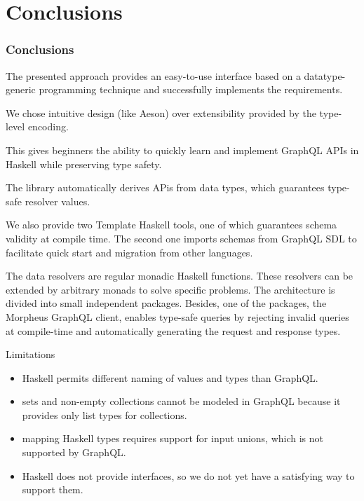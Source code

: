 \section{Conclusions}

\begin{frame}[allowframebreaks]\frametitle{Conclusions}

The presented approach provides an easy-to-use interface based on a datatype-generic programming technique and successfully implements the requirements. 

We chose intuitive design (like Aeson) over extensibility provided by the type-level encoding. 

This gives beginners the ability to quickly learn and implement GraphQL APIs in Haskell while preserving type safety.

The library automatically derives APis from data types, which guarantees type-safe resolver values. 

We also provide two Template Haskell tools, one of which guarantees schema validity at compile time. The second one imports schemas from GraphQL SDL to facilitate quick start and migration from other languages.

The data resolvers are regular monadic Haskell functions. These resolvers can be extended by arbitrary monads to solve specific problems.  The architecture is divided into small independent packages. Besides, one of the packages, the Morpheus GraphQL client, enables type-safe queries by rejecting invalid queries at compile-time and automatically generating the request and response types.
    
Limitations

\begin{itemize}
    \item Haskell permits different naming of values and types than GraphQL. 
    \item sets and non-empty collections cannot be modeled in GraphQL because it provides only list types for collections. 
    \item mapping Haskell types requires support for input unions, which is not supported by GraphQL. 
    \item Haskell does not provide interfaces, so we do not yet have a satisfying way to support them. 
\end{itemize}

\end{frame}

